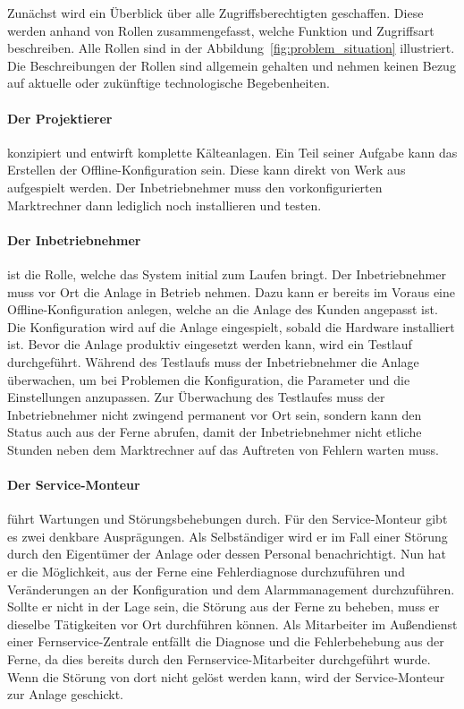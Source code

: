 \documentclass[11pt,a4paper]{report}
\begin{document}
Zunächst wird ein Überblick über alle Zugriffsberechtigten geschaffen. Diese werden anhand von Rollen zusammengefasst, welche Funktion und Zugriffsart beschreiben. Alle Rollen sind in der Abbildung~\ref{fig:problem_situation} illustriert. Die Beschreibungen der Rollen sind allgemein gehalten und nehmen keinen Bezug auf aktuelle oder zukünftige technologische Begebenheiten.

\paragraph{Der Projektierer} konzipiert und entwirft komplette Kälteanlagen. Ein Teil seiner Aufgabe kann das Erstellen der Offline-Konfiguration sein. Diese kann direkt von Werk aus aufgespielt werden. Der Inbetriebnehmer muss den vorkonfigurierten Marktrechner dann lediglich noch installieren und testen.

\paragraph{Der Inbetriebnehmer} ist die Rolle, welche das System initial zum Laufen bringt. Der Inbetriebnehmer muss vor Ort die Anlage in Betrieb nehmen. Dazu kann er bereits im Voraus eine Offline-Konfiguration anlegen, welche an die Anlage des Kunden angepasst ist. Die Konfiguration wird auf die Anlage eingespielt, sobald die Hardware installiert ist. Bevor die Anlage produktiv eingesetzt werden kann, wird ein Testlauf durchgeführt. Während des Testlaufs muss der Inbetriebnehmer die Anlage überwachen, um bei Problemen die Konfiguration, die Parameter und die Einstellungen anzupassen. Zur Überwachung des Testlaufes muss der Inbetriebnehmer nicht zwingend permanent vor Ort sein, sondern kann den Status auch aus der Ferne abrufen, damit der Inbetriebnehmer nicht etliche Stunden neben dem Marktrechner auf das Auftreten von Fehlern warten muss.

\paragraph{Der Service-Monteur} führt Wartungen und Störungsbehebungen durch. Für den Service-Monteur gibt es zwei denkbare Ausprägungen. Als Selbständiger wird er im Fall einer Störung durch den Eigentümer der Anlage oder dessen Personal benachrichtigt. Nun hat er die Möglichkeit, aus der Ferne eine Fehlerdiagnose durchzuführen und Veränderungen an der Konfiguration und dem Alarmmanagement durchzuführen. Sollte er nicht in der Lage sein, die Störung aus der Ferne zu beheben, muss er dieselbe Tätigkeiten vor Ort durchführen können. Als Mitarbeiter im Außendienst einer Fernservice-Zentrale entfällt die Diagnose und die Fehlerbehebung aus der Ferne, da dies bereits durch den Fernservice-Mitarbeiter durchgeführt wurde. Wenn die Störung von dort nicht gelöst werden kann, wird der Service-Monteur zur Anlage geschickt.
\end{document}
